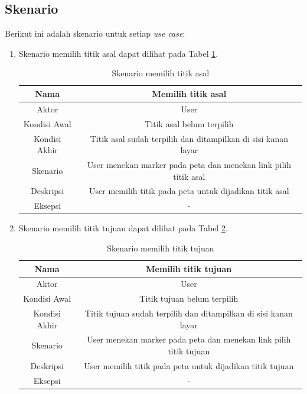 \subsection{Skenario}
Berikut ini adalah skenario untuk setiap \textit{use case}:
\begin{enumerate}
  \item Skenario memilih titik asal dapat dilihat pada Tabel
  \ref{tab:titik_asal}.  
\begin{table}[h]
\centering
\caption{Skenario memilih titik asal} 
\label{tab:titik_asal}
\begin{tabular}{|c|c|}
\hline
Nama          & Memilih titik asal                                              \\ \hline
Aktor         & User                                                            \\ \hline
Kondisi Awal  & Titik asal belum terpilih                                       \\ \hline
Kondisi Akhir & Titik asal sudah terpilih dan ditampilkan di sisi kanan layar   \\ \hline
Skenario      & User menekan marker pada peta dan menekan link pilih titik asal \\ \hline
Deskripsi     & User memilih titik pada peta untuk dijadikan titik asal         \\ \hline
Eksepsi       & -                                                               \\ \hline
\end{tabular}
\end{table}

  \item Skenario memilih titik tujuan dapat dilihat pada Tabel
  \ref{tab:titik_tujuan}.
\begin{table}[h]
\centering
\caption{Skenario memilih titik tujuan} 
\label{tab:titik_tujuan}
\begin{tabular}{|c|c|}
\hline
Nama          & Memilih titik tujuan                                              \\ \hline
Aktor         & User                                                              \\ \hline
Kondisi Awal  & Titik tujuan belum terpilih                                       \\ \hline
Kondisi Akhir & Titik tujuan sudah terpilih dan ditampilkan di sisi kanan layar   \\ \hline
Skenario      & User menekan marker pada peta dan menekan link pilih titik tujuan \\ \hline
Deskripsi     & User memilih titik pada peta untuk dijadikan titik tujuan         \\ \hline
Eksepsi       & -                                                                 \\ \hline
\end{tabular}
\end{table}


\end{enumerate}
